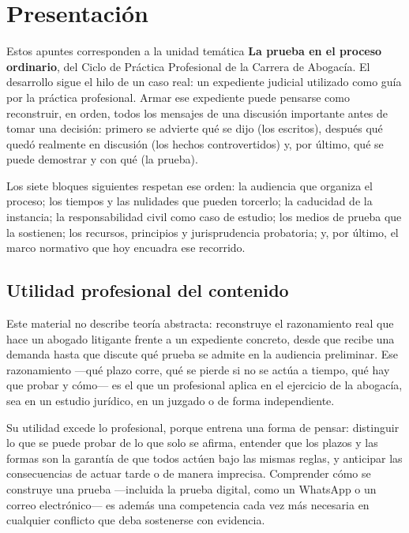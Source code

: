 \documentclass[12pt,oneside]{book}
\begin{document}

\chapter*{Presentación}

Estos apuntes corresponden a la unidad temática \textbf{La prueba en el proceso ordinario}, del Ciclo de Práctica Profesional de la Carrera de Abogacía. El desarrollo sigue el hilo de un caso real: un expediente judicial utilizado como guía por la práctica profesional. Armar ese expediente puede pensarse como reconstruir, en orden, todos los mensajes de una discusión importante antes de tomar una decisión: primero se advierte qué se dijo (los escritos), después qué quedó realmente en discusión (los hechos controvertidos) y, por último, qué se puede demostrar y con qué (la prueba).

Los siete bloques siguientes respetan ese orden: la audiencia que organiza el proceso; los tiempos y las nulidades que pueden torcerlo; la caducidad de la instancia; la responsabilidad civil como caso de estudio; los medios de prueba que la sostienen; los recursos, principios y jurisprudencia probatoria; y, por último, el marco normativo que hoy encuadra ese recorrido.

\section*{Utilidad profesional del contenido}

Este material no describe teoría abstracta: reconstruye el razonamiento real que hace un abogado litigante frente a un expediente concreto, desde que recibe una demanda hasta que discute qué prueba se admite en la audiencia preliminar. Ese razonamiento ---qué plazo corre, qué se pierde si no se actúa a tiempo, qué hay que probar y cómo--- es el que un profesional aplica en el ejercicio de la abogacía, sea en un estudio jurídico, en un juzgado o de forma independiente.

Su utilidad excede lo profesional, porque entrena una forma de pensar: distinguir lo que se puede probar de lo que solo se afirma, entender que los plazos y las formas son la garantía de que todos actúen bajo las mismas reglas, y anticipar las consecuencias de actuar tarde o de manera imprecisa. Comprender cómo se construye una prueba ---incluida la prueba digital, como un WhatsApp o un correo electrónico--- es además una competencia cada vez más necesaria en cualquier conflicto que deba sostenerse con evidencia.
\end{document}
